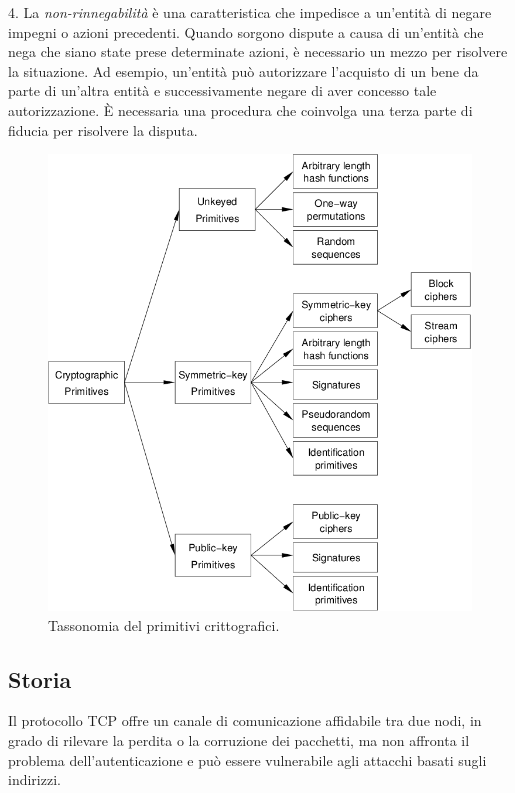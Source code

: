 \documentclass{article}
\theoremstyle{definition}
\begin{document}
4. La \textit{non-rinnegabilità} è una caratteristica che impedisce a un'entità di negare impegni o azioni precedenti. Quando sorgono dispute a causa di un'entità che nega che siano state prese determinate azioni, è necessario un mezzo per risolvere la situazione. Ad esempio, un'entità può autorizzare l'acquisto di un bene da parte di un'altra entità e successivamente negare di aver concesso tale autorizzazione. È necessaria una procedura che coinvolga una terza parte di fiducia per risolvere la disputa.

\begin{figure}[H]
    \centering
    \includegraphics[height=0.5\textheight]{img/taxonomy.png}
    \caption{Tassonomia del primitivi crittografici.}
    \label{fig:itm}
\end{figure}

\subsection{Storia}
Il protocollo TCP offre un canale di comunicazione affidabile tra due nodi, in grado di rilevare la perdita o la corruzione dei pacchetti, ma non affronta il problema dell'autenticazione e può essere vulnerabile agli attacchi basati sugli indirizzi.
\end{document}
